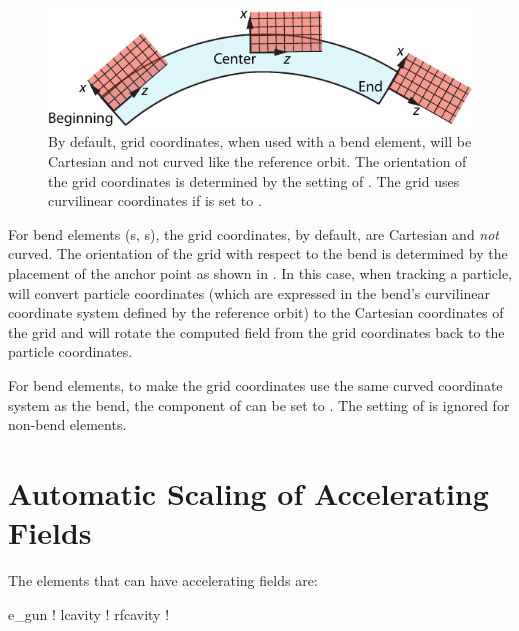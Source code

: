 \begin{figure}[tb]
  \centering
  \includegraphics{bend-grid-coords.pdf}
  \caption[Grid coordinates when used with a bend element.]{
By default, grid coordinates, when used with a bend element, will be Cartesian and not
curved like the reference orbit. The orientation of the grid coordinates is determined by
the setting of . The grid uses curvilinear coordinates if
 is set to .}
  \label{f:bend.grid}
\end{figure}

For bend elements (s, s), the grid coordinates, by default, are
Cartesian and {\em not} curved. The orientation of the grid with respect to the bend is
determined by the placement of the anchor point as shown in . In this
case, when tracking a particle, \bmad will convert particle coordinates (which are
expressed in the bend's curvilinear coordinate system defined by the reference orbit) to
the Cartesian coordinates of the grid and will rotate the computed field from the grid
coordinates back to the particle coordinates.

For bend elements, to make the grid coordinates use the same curved coordinate system as
the bend, the  component of  can be set to . The
setting of  is ignored for non-bend elements.

\section{Automatic Scaling of Accelerating Fields}
\label{s:autoscale}

The elements that can have accelerating fields are:
\begin{example}
  e_gun       ! 
  lcavity     ! 
  rfcavity    ! 
\end{example}

